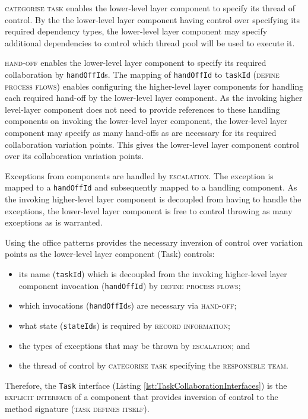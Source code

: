 \documentclass[prodmode]{style/acmlarge}
\begin{document}
\textsc{categorise task} enables the lower-level layer component to specify its
thread of control.  By the the lower-level layer component having control over
specifying its required dependency types, the lower-level layer component may
specify additional dependencies to control which thread pool will be used to
execute it.

\textsc{hand-off} enables the lower-level layer component to specify its
required collaboration by \texttt{handOffId}s.  The mapping of
\texttt{handOffId} to \texttt{taskId} (\textsc{define process flows}) enables
configuring the higher-level layer components for handling each required
hand-off by the lower-level layer component.  As the invoking higher level-layer
component does not need to provide references to these handling components on
invoking the lower-level layer component, the lower-level layer component may
specify as many hand-offs as are necessary for its required collaboration
variation points.  This gives the lower-level layer component control over its
collaboration variation points.

Exceptions from components are handled by \textsc{escalation}.  The
exception is mapped to a \texttt{handOffId} and subsequently mapped to a
handling component.  As the invoking higher-level layer component is decoupled
from having to handle the exceptions, the lower-level layer component is free to
control throwing as many exceptions as is warranted.

Using the office patterns provides the necessary inversion of control over
variation points as the lower-level layer component (Task) controls:
\begin{itemize}
  \item its name (\texttt{taskId}) which is decoupled from the invoking higher-level layer component invocation (\texttt{handOffId}) by \textsc{define process flows};
  \item which invocations (\texttt{handOffId}s) are necessary via \textsc{hand-off};
  \item what state (\texttt{stateId}s) is required by \textsc{record information};
  \item the types of exceptions that may be thrown by \textsc{escalation}; and
  \item the thread of control by \textsc{categorise task} specifying the \textsc{responsible team}.
\end{itemize}

Therefore, the \texttt{Task} interface (Listing
\ref{lst:TaskCollaborationInterfaces}) is the \textsc{explicit interface} of a
component that provides inversion of control to the method signature
(\textsc{task defines itself}).
\end{document}
